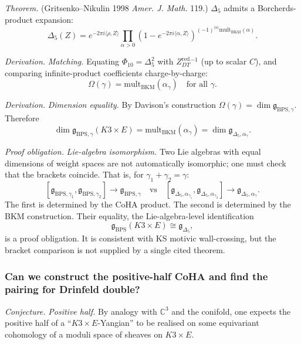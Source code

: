 \emph{Theorem.} (Gritsenko--Nikulin 1998 \emph{Amer. J. Math.} 119.)
$\Delta_5$ admits a Borcherds-product expansion:
\[
\Delta_5(Z) = e^{-2\pi i \langle \rho, Z\rangle}
\prod_{\alpha > 0}(1 - e^{-2\pi i \langle \alpha, Z\rangle})^{(-1)^{|\alpha|}\mathrm{mult}_{\mathrm{BKM}}(\alpha)}.
\]

\emph{Derivation.} \emph{Matching.} Equating $\Phi_{10} = \Delta_5^2$ with
$Z^{\mathrm{red}}_{DT}{}^{-1}$ (up to scalar $C$), and comparing infinite-product
coefficients charge-by-charge:
\[
\Omega(\gamma) = \mathrm{mult}_{\mathrm{BKM}}(\alpha_\gamma) \quad \text{for all } \gamma.
\]

\emph{Derivation.} \emph{Dimension equality.}
By Davison's construction $\Omega(\gamma) = \dim \mathfrak{g}_{\mathrm{BPS}, \gamma}$.
Therefore
\[
\dim \mathfrak{g}_{\mathrm{BPS}, \gamma}(K3 \times E) = \mathrm{mult}_{\mathrm{BKM}}(\alpha_\gamma) = \dim \mathfrak{g}_{\Delta_5, \alpha_\gamma}.
\]

\emph{Proof obligation.} \emph{Lie-algebra isomorphism.}
Two Lie algebras with equal dimensions of weight spaces are not automatically isomorphic;
one must check that the brackets coincide. That is, for $\gamma_1 + \gamma_2 = \gamma$:
\[
[\mathfrak{g}_{\mathrm{BPS}, \gamma_1}, \mathfrak{g}_{\mathrm{BPS}, \gamma_2}] \to
\mathfrak{g}_{\mathrm{BPS}, \gamma} \quad \text{vs} \quad
[\mathfrak{g}_{\Delta_5, \alpha_{\gamma_1}}, \mathfrak{g}_{\Delta_5, \alpha_{\gamma_2}}]
\to \mathfrak{g}_{\Delta_5, \alpha_\gamma}.
\]
The first is determined by the CoHA product. The second is determined by the BKM
construction. Their equality, the Lie-algebra-level identification
\[
\mathfrak{g}_{\mathrm{BPS}}(K3 \times E)
\cong
\mathfrak{g}_{\Delta_5},
\]
is a proof obligation. It is consistent with KS motivic wall-crossing,
but the bracket comparison is not supplied by a single cited theorem.

\subsubsection{Can we construct the positive-half CoHA and find the pairing for Drinfeld double?}

\emph{Conjecture.} \emph{Positive half.} By analogy with $\mathbb{C}^3$ and the
conifold, one expects the positive half of a ``$K3 \times E$-Yangian'' to be realised on
some equivariant cohomology of a moduli space of sheaves on $K3 \times E$.

